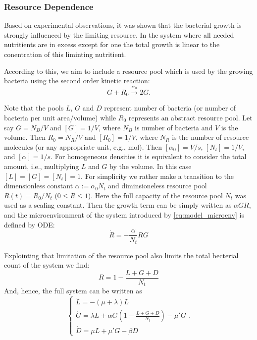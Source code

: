 \documentclass[10pt,A4paper]{article}
\begin{document}
\subsubsection{Resource Dependence}

Based on experimental observations, it was shown that the bacterial growth is strongly influenced by the limiting resource. 
In the system where all needed nutritients are in excess except for one the total growth is linear to the conentration of this liminting nutritient. 

According to this, we aim to include a resource pool which is used by the growing bacteria using the second order kinetic reaction:
\begin{equation}
    G + R_0  \stackrel{\alpha_0}{\longrightarrow} 2G.
\end{equation}

Note that the pools $L$, $G$ and $D$ represent number of bacteria (or number of bacteria per unit area/volume) while $R_0$ represents an abstract resource pool. 
Let say $G=N_B/V$ and $[G]=1/V$, where $N_B$ is number of bacteria and $V$ is the volume. 
Then $R_0=N_R/V$ and $[R_0]=1/V$, where $N_R$ is the number of resource molecules (or any appropriate unit, e.g., mol). 
Then $[\alpha_0]=V/s$, $[N_t]=1/V$, and $[\alpha]=1/s$. 
For homogeneous densities it is equivalent to consider the total amount, i.e., multiplying $L$ and $G$ by the volume. 
In this case $[L]=[G]=[N_t]=1$.
For simplicity we rather make a transition to the dimensionless constant $\alpha:=\alpha_0 N_t$ and diminsioneless resource pool $R(t) = R_0 / N_t$ ($0 \leqslant R \leqslant 1$).
Here the full capacity of the resource pool $N_t$ was used as a scaling constant.
Then the growth term can be simply written as $\alpha G R$, and the microenvironment of the system introduced by \ref{eq:model_microenv} is defined by ODE:
\begin{equation}
\dot{R} = -\frac{\alpha}{N_t} R G
\end{equation}

Explointing that limitation of the resource pool also limits the total becterial count of the system  we find:
\begin{equation}
    R = 1 - \frac{L+G+D}{N_t}
\end{equation}
And, hence, the full system can be written as
\begin{equation}
    \begin{cases}
        \dot{L} = -(\mu + \lambda) L\\
        \dot{G} = \lambda L + \alpha G\left(1-\frac{L+G+D}{N_t}\right)-\mu' G\\
        \dot{D} = \mu  L + \mu' G- \beta D  
    \end{cases}.
\end{equation}
\end{document}
